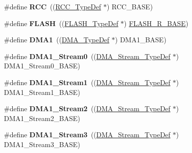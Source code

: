 \begin{DoxyCompactItemize}
\item 
\hypertarget{group___peripheral__declaration_ga74944438a086975793d26ae48d5882d4}{\#define {\bfseries R\-C\-C}~((\hyperlink{struct_r_c_c___type_def}{R\-C\-C\-\_\-\-Type\-Def} $\ast$) R\-C\-C\-\_\-\-B\-A\-S\-E)}\label{group___peripheral__declaration_ga74944438a086975793d26ae48d5882d4}

\item 
\hypertarget{group___peripheral__declaration_ga844ea28ba1e0a5a0e497f16b61ea306b}{\#define {\bfseries F\-L\-A\-S\-H}~((\hyperlink{struct_f_l_a_s_h___type_def}{F\-L\-A\-S\-H\-\_\-\-Type\-Def} $\ast$) \hyperlink{group___peripheral__memory__map_ga8e21f4845015730c5731763169ec0e9b}{F\-L\-A\-S\-H\-\_\-\-R\-\_\-\-B\-A\-S\-E})}\label{group___peripheral__declaration_ga844ea28ba1e0a5a0e497f16b61ea306b}

\item 
\hypertarget{group___peripheral__declaration_gacc16d2a5937f7585320a98f7f6b578f9}{\#define {\bfseries D\-M\-A1}~((\hyperlink{struct_d_m_a___type_def}{D\-M\-A\-\_\-\-Type\-Def} $\ast$) D\-M\-A1\-\_\-\-B\-A\-S\-E)}\label{group___peripheral__declaration_gacc16d2a5937f7585320a98f7f6b578f9}

\item 
\hypertarget{group___peripheral__declaration_ga61247dd5d594289c404dd8774202dfd8}{\#define {\bfseries D\-M\-A1\-\_\-\-Stream0}~((\hyperlink{struct_d_m_a___stream___type_def}{D\-M\-A\-\_\-\-Stream\-\_\-\-Type\-Def} $\ast$) D\-M\-A1\-\_\-\-Stream0\-\_\-\-B\-A\-S\-E)}\label{group___peripheral__declaration_ga61247dd5d594289c404dd8774202dfd8}

\item 
\hypertarget{group___peripheral__declaration_gaf7d82f110f19982d483eebc465d222b2}{\#define {\bfseries D\-M\-A1\-\_\-\-Stream1}~((\hyperlink{struct_d_m_a___stream___type_def}{D\-M\-A\-\_\-\-Stream\-\_\-\-Type\-Def} $\ast$) D\-M\-A1\-\_\-\-Stream1\-\_\-\-B\-A\-S\-E)}\label{group___peripheral__declaration_gaf7d82f110f19982d483eebc465d222b2}

\item 
\hypertarget{group___peripheral__declaration_gad0e2140b8eeec3594035f1a7bf2a7250}{\#define {\bfseries D\-M\-A1\-\_\-\-Stream2}~((\hyperlink{struct_d_m_a___stream___type_def}{D\-M\-A\-\_\-\-Stream\-\_\-\-Type\-Def} $\ast$) D\-M\-A1\-\_\-\-Stream2\-\_\-\-B\-A\-S\-E)}\label{group___peripheral__declaration_gad0e2140b8eeec3594035f1a7bf2a7250}

\item 
\hypertarget{group___peripheral__declaration_ga96ac1af7a92469fe86a9fbdec091f25d}{\#define {\bfseries D\-M\-A1\-\_\-\-Stream3}~((\hyperlink{struct_d_m_a___stream___type_def}{D\-M\-A\-\_\-\-Stream\-\_\-\-Type\-Def} $\ast$) D\-M\-A1\-\_\-\-Stream3\-\_\-\-B\-A\-S\-E)}\label{group___peripheral__declaration_ga96ac1af7a92469fe86a9fbdec091f25d}


\end{DoxyCompactItemize}
